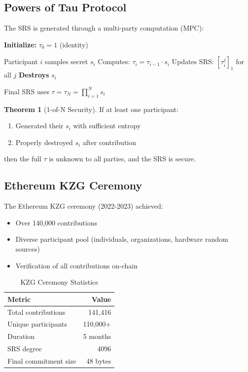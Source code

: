 \documentclass[11pt,a4paper]{article}
\theoremstyle{definition}
\newtheorem{theorem}{Theorem}
\begin{document}
\subsection{Powers of Tau Protocol}

The SRS is generated through a multi-party computation (MPC):

\begin{algorithm}
\caption{Powers of Tau MPC}
\begin{algorithmic}[1]
\State \textbf{Initialize:} $\tau_0 = 1$ (identity)

    \State Participant $i$ samples secret $s_i$
    \State Computes: $\tau_i = \tau_{i-1} \cdot s_i$
    \State Updates SRS: $[\tau_i^j]_1$ for all $j$
    \State \textbf{Destroys} $s_i$
\EndFor

\State Final SRS uses $\tau = \tau_N = \prod_{i=1}^{N} s_i$
\end{algorithmic}
\end{algorithm}

\begin{theorem}[1-of-N Security]
    If at least one participant:
    \begin{enumerate}
        \item Generated their $s_i$ with sufficient entropy
        \item Properly destroyed $s_i$ after contribution
    \end{enumerate}
    then the full $\tau$ is unknown to all parties, and the SRS is secure.
\end{theorem}

\subsection{Ethereum KZG Ceremony}

The Ethereum KZG ceremony (2022-2023) achieved:
\begin{itemize}
    \item Over 140,000 contributions
    \item Diverse participant pool (individuals, organizations, hardware random sources)
    \item Verification of all contributions on-chain
\end{itemize}

\begin{table}[h]
\centering
\caption{KZG Ceremony Statistics}
\begin{tabular}{lr}
\toprule
Metric & Value \\
\midrule
Total contributions & 141,416 \\
Unique participants & 110,000+ \\
Duration & 5 months \\
SRS degree & 4096 \\
Final commitment size & 48 bytes \\
\bottomrule
\end{tabular}
\end{table}
\end{document}
